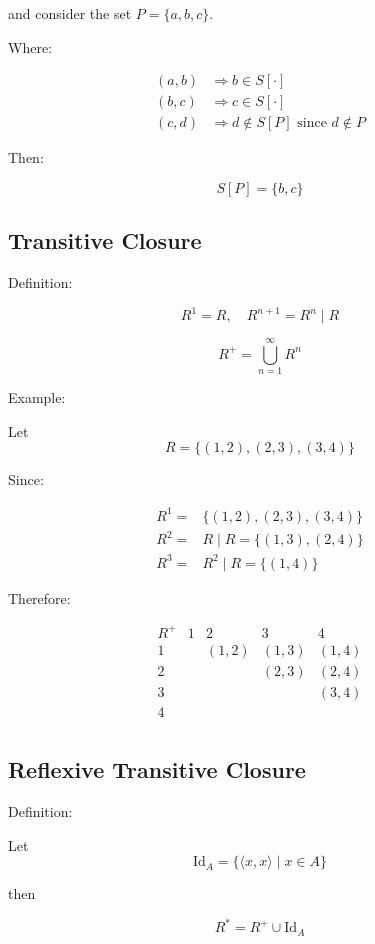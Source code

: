 \documentclass[12pt,a4paper,openany]{article}
\begin{document}
and consider the set $P = \{a,b,c\}$.

Where:

$$\begin{aligned}
   (a,b) &\Rightarrow b \in S[\cdot]\\
    (b,c) &\Rightarrow c \in S[\cdot]\\
    (c,d) &\Rightarrow d \notin S[P] \text{ since } d \notin P
\end{aligned}
$$  

Then:

$$
S[P] = \{b,c\}
$$

\subsection{Transitive Closure}

Definition:

$$
R^1 = R, \quad R^{n+1} = R^n \mid R
$$

$$
R^+ = \displaystyle\bigcup_{n=1}^{\infty} R^n
$$

Example:

Let $$R = \{ (1,2), (2,3), (3,4) \}$$ 

Since:

$$\begin{aligned}
R^1 =& \{ (1,2), (2,3), (3,4) \} \\
R^2 =& R \mid R = \{ (1,3), (2,4) \} \\
R^3 =& R^2 \mid R = \{ (1,4) \}
\end{aligned}$$

Therefore:

$$
\begin{array}{c|cccc}
R^+ & 1 & 2 & 3 & 4 \\
\hline
1 & & (1,2) & (1,3) & (1,4) \\
2 & & & (2,3) & (2,4) \\
3 & & & & (3,4) \\
4 & & & & \\
\end{array}
$$

\subsection{Reflexive Transitive Closure}

Definition:

Let $$\text{Id}_A = \{ \langle x, x \rangle \mid x \in A \}$$

then

$$
R^* = R^+ \cup \text{Id}_A
$$
\end{document}
